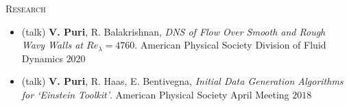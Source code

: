 \documentclass[10pt]{article}
\begin{document}
\vspace{-1.5em}
\begin{multicols}{2}
\textsc{Research}
\columnbreak

\vspace{-1.75em}
\begin{itemize}[label= ,leftmargin= 1.0em]
    \setlength{\itemindent}{-1.0em}
    \setlength\itemsep{-0.25em}
    \item (talk) \textbf{V. Puri}, R. Balakrishnan, \textit{DNS of Flow Over Smooth and Rough Wavy Walls at $\mathit{Re}_\lambda=4760$}. American Physical Society Division of Fluid Dynamics $2020$
    \item (talk) \textbf{V. Puri}, R. Haas, E. Bentivegna, \textit{Initial Data Generation Algorithms for `Einstein Toolkit'}. American Physical Society April Meeting $2018$
\end{itemize}
\vspace{-2.0em}

\end{multicols}
\vspace{-1.5em}
\end{document}
